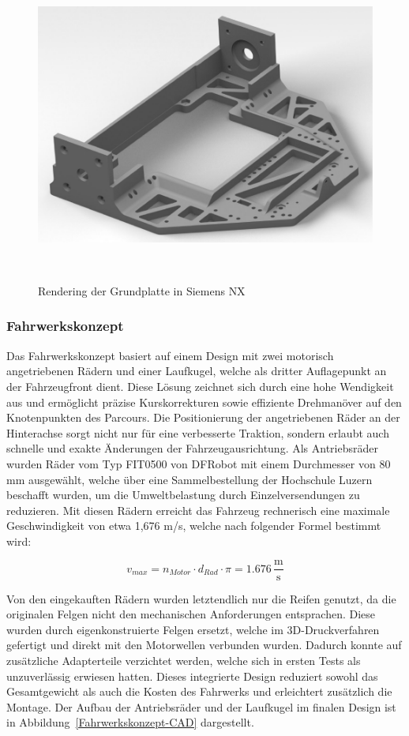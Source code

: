 \documentclass[main.tex]{subfiles} %
\begin{document}
\begin{figure}[H]
    \centering
    \includegraphics[width = 0.9\linewidth]{./fig_Mechanik/Rendering_Grundplatte.pdf}
    \caption{Rendering der Grundplatte in Siemens NX}~\label{Chassis-Grundplatte}
\end{figure}

\newpage

\subsubsection*{Fahrwerkskonzept}

Das Fahrwerkskonzept basiert auf einem Design mit zwei motorisch angetriebenen Rädern 
und einer Laufkugel, welche als dritter Auflagepunkt an der Fahrzeugfront dient. 
Diese Lösung zeichnet sich durch eine hohe Wendigkeit aus und ermöglicht präzise 
Kurskorrekturen sowie effiziente Drehmanöver auf den Knotenpunkten des Parcours. 
Die Positionierung der angetriebenen Räder an der Hinterachse sorgt nicht nur für eine 
verbesserte Traktion, sondern erlaubt auch schnelle und exakte Änderungen der 
Fahrzeugausrichtung. Als Antriebsräder wurden Räder vom Typ FIT0500 von DFRobot mit 
einem Durchmesser von 80 mm ausgewählt, welche über eine Sammelbestellung der Hochschule 
Luzern beschafft wurden, um die Umweltbelastung durch Einzelversendungen zu reduzieren. 
Mit diesen Rädern erreicht das Fahrzeug rechnerisch eine maximale Geschwindigkeit von 
etwa 1,676 m/s, welche nach folgender Formel bestimmt wird:

\[ v_{max} = n_{Motor} \cdot d_{Rad} \cdot \pi = 1.676 \, \frac{\text{m}}{\text{s}} \]

Von den eingekauften Rädern wurden letztendlich nur die Reifen genutzt, da die 
originalen Felgen nicht den mechanischen Anforderungen entsprachen. Diese wurden durch 
eigenkonstruierte Felgen ersetzt, welche im 3D-Druckverfahren gefertigt und direkt mit 
den Motorwellen verbunden wurden. Dadurch konnte auf zusätzliche Adapterteile verzichtet 
werden, welche sich in ersten Tests als unzuverlässig erwiesen hatten. Dieses integrierte 
Design reduziert sowohl das Gesamtgewicht als auch die Kosten des Fahrwerks und 
erleichtert zusätzlich die Montage. Der Aufbau der Antriebsräder und der Laufkugel im 
finalen Design ist in Abbildung~\ref{Fahrwerkskonzept-CAD} dargestellt.
\end{document}
